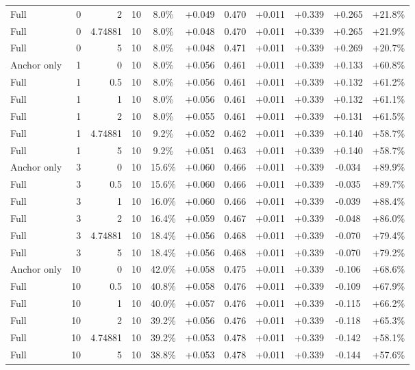 \begin{table}[htbp]
\begin{tabular}{lrrrccccccc}
Full & 0 & 2 & 10 & 8.0\% & +0.049 & 0.470 & +0.011 & +0.339 & +0.265 & +21.8\% \\
Full & 0 & 4.74881 & 10 & 8.0\% & +0.048 & 0.470 & +0.011 & +0.339 & +0.265 & +21.9\% \\
Full & 0 & 5 & 10 & 8.0\% & +0.048 & 0.471 & +0.011 & +0.339 & +0.269 & +20.7\% \\
Anchor only & 1 & 0 & 10 & 8.0\% & +0.056 & 0.461 & +0.011 & +0.339 & +0.133 & +60.8\% \\
Full & 1 & 0.5 & 10 & 8.0\% & +0.056 & 0.461 & +0.011 & +0.339 & +0.132 & +61.2\% \\
Full & 1 & 1 & 10 & 8.0\% & +0.056 & 0.461 & +0.011 & +0.339 & +0.132 & +61.1\% \\
Full & 1 & 2 & 10 & 8.0\% & +0.055 & 0.461 & +0.011 & +0.339 & +0.131 & +61.5\% \\
Full & 1 & 4.74881 & 10 & 9.2\% & +0.052 & 0.462 & +0.011 & +0.339 & +0.140 & +58.7\% \\
Full & 1 & 5 & 10 & 9.2\% & +0.051 & 0.463 & +0.011 & +0.339 & +0.140 & +58.7\% \\
Anchor only & 3 & 0 & 10 & 15.6\% & +0.060 & 0.466 & +0.011 & +0.339 & -0.034 & +89.9\% \\
Full & 3 & 0.5 & 10 & 15.6\% & +0.060 & 0.466 & +0.011 & +0.339 & -0.035 & +89.7\% \\
Full & 3 & 1 & 10 & 16.0\% & +0.060 & 0.466 & +0.011 & +0.339 & -0.039 & +88.4\% \\
Full & 3 & 2 & 10 & 16.4\% & +0.059 & 0.467 & +0.011 & +0.339 & -0.048 & +86.0\% \\
Full & 3 & 4.74881 & 10 & 18.4\% & +0.056 & 0.468 & +0.011 & +0.339 & -0.070 & +79.4\% \\
Full & 3 & 5 & 10 & 18.4\% & +0.056 & 0.468 & +0.011 & +0.339 & -0.070 & +79.2\% \\
Anchor only & 10 & 0 & 10 & 42.0\% & +0.058 & 0.475 & +0.011 & +0.339 & -0.106 & +68.6\% \\
Full & 10 & 0.5 & 10 & 40.8\% & +0.058 & 0.476 & +0.011 & +0.339 & -0.109 & +67.9\% \\
Full & 10 & 1 & 10 & 40.0\% & +0.057 & 0.476 & +0.011 & +0.339 & -0.115 & +66.2\% \\
Full & 10 & 2 & 10 & 39.2\% & +0.056 & 0.476 & +0.011 & +0.339 & -0.118 & +65.3\% \\
Full & 10 & 4.74881 & 10 & 39.2\% & +0.053 & 0.478 & +0.011 & +0.339 & -0.142 & +58.1\% \\
Full & 10 & 5 & 10 & 38.8\% & +0.053 & 0.478 & +0.011 & +0.339 & -0.144 & +57.6\% \\

\end{tabular}
\end{table}
